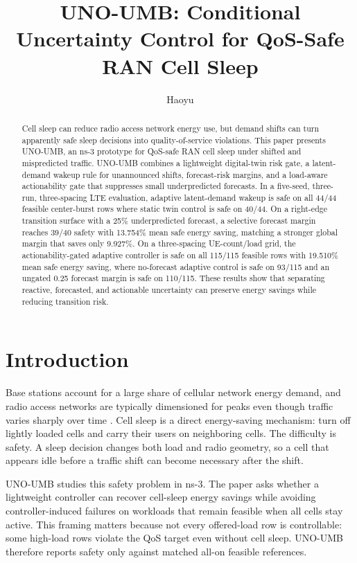 \documentclass[10pt,twocolumn]{article}
\title{UNO-UMB: Conditional Uncertainty Control for QoS-Safe RAN Cell Sleep}
\author{Haoyu}
\date{}
\begin{document}
\maketitle

\begin{abstract}
Cell sleep can reduce radio access network energy use, but demand shifts can
turn apparently safe sleep decisions into quality-of-service violations.
This paper presents UNO-UMB, an ns-3 prototype for QoS-safe RAN cell sleep
under shifted and mispredicted traffic.  UNO-UMB combines a lightweight
digital-twin risk gate, a latent-demand wakeup rule for unannounced shifts,
forecast-risk margins, and a load-aware actionability gate that suppresses
small underpredicted forecasts.  In a five-seed, three-run, three-spacing LTE
evaluation, adaptive latent-demand wakeup is safe on all 44/44 feasible
center-burst rows where static twin control is safe on 40/44.  On a
right-edge transition surface with a 25\% underpredicted forecast, a selective
forecast margin reaches 39/40 safety with 13.754\% mean safe energy saving,
matching a stronger global margin that saves only 9.927\%.  On a
three-spacing UE-count/load grid, the actionability-gated adaptive controller
is safe on all 115/115 feasible rows with 19.510\% mean safe energy saving,
where no-forecast adaptive control is safe on 93/115 and an ungated 0.25
forecast margin is safe on 110/115.
These results show that separating reactive, forecasted, and actionable
uncertainty can preserve energy savings while reducing transition risk.
\end{abstract}

\section{Introduction}

Base stations account for a large share of cellular network energy demand, and
radio access networks are typically dimensioned for peaks even though traffic
varies sharply over time \cite{auer2011energy,hasan2011green}.  Cell sleep is
a direct energy-saving mechanism: turn off lightly loaded cells and carry their
users on neighboring cells.  The difficulty is safety.  A sleep decision changes
both load and radio geometry, so a cell that appears idle before a traffic shift
can become necessary after the shift.

UNO-UMB studies this safety problem in ns-3.  The paper asks whether a
lightweight controller can recover cell-sleep energy savings while avoiding
controller-induced failures on workloads that remain feasible when all cells
stay active.  This framing matters because not every offered-load row is
controllable: some high-load rows violate the QoS target even without cell
sleep.  UNO-UMB therefore reports safety only against matched all-on feasible
references.
\end{document}

